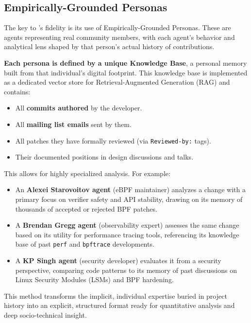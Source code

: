 \subsection{Empirically-Grounded Personas}

The key to \sys's fidelity is its use of Empirically-Grounded Personas. These are agents representing real community members, with each agent's behavior and analytical lens shaped by that person's actual history of contributions.

\textbf{Each persona is defined by a unique Knowledge Base}, a personal memory built from that individual's digital footprint. This knowledge base is implemented as a dedicated vector store for Retrieval-Augmented Generation (RAG) and contains:

\begin{itemize}
\item All \textbf{commits authored} by the developer.
\item All \textbf{mailing list emails} sent by them.
\item All patches they have formally reviewed (via \texttt{Reviewed-by:} tags).
\item Their documented positions in design discussions and talks.
\end{itemize}

This allows for highly specialized analysis. For example:

\begin{itemize}
\item An \textbf{Alexei Starovoitov agent} (eBPF maintainer) analyzes a change with a primary focus on verifier safety and API stability, drawing on its memory of thousands of accepted or rejected BPF patches.
\item A \textbf{Brendan Gregg agent} (observability expert) assesses the same change based on its utility for performance tracing tools, referencing its knowledge base of past \texttt{perf} and \texttt{bpftrace} developments.
\item A \textbf{KP Singh agent} (security developer) evaluates it from a security perspective, comparing code patterns to its memory of past discussions on Linux Security Modules (LSMs) and BPF hardening.
\end{itemize}

This method transforms the implicit, individual expertise buried in project history into an explicit, structured format ready for quantitative analysis and deep socio-technical insight.

